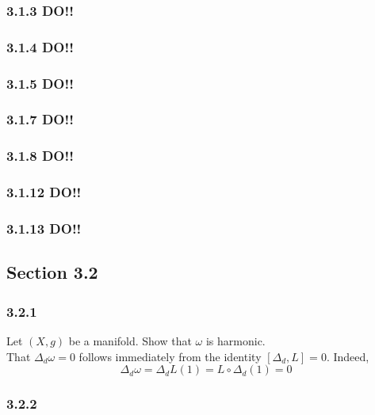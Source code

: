 \documentclass[12pt]{article}
\begin{document}
\subsubsection{3.1.3 DO!!}

\subsubsection{3.1.4 DO!!}

\subsubsection{3.1.5 DO!!}


\subsubsection{3.1.7 DO!!}


\subsubsection{3.1.8 DO!!}

\subsubsection{3.1.12 DO!!}

\subsubsection{3.1.13 DO!!}

\subsection{Section 3.2}

\subsubsection{3.2.1} 

Let $(X, g)$ be a \kahler manifold. Show that $\omega$ is harmonic.
\bigskip\\
That $\Delta_d \omega = 0$ follows immediately from the \kahler identity $[\Delta_d, L] = 0$. Indeed,
\[ \Delta_d \omega = \Delta_d L(1) = L \circ \Delta_d (1) = 0 \]
 
\subsubsection{3.2.2}
\end{document}
